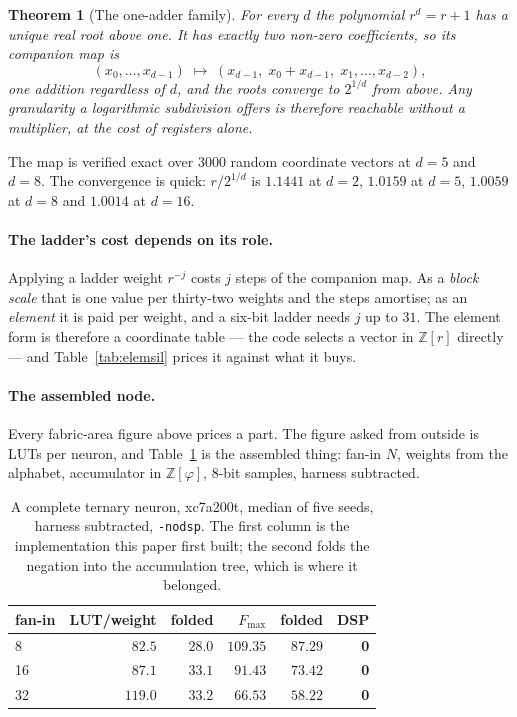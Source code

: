 \documentclass[11pt]{article}
\newtheorem{theorem}{Theorem}
\theoremstyle{definition}
\begin{document}
\begin{theorem}[The one-adder family]\label{thm:oneadder}
For every $d$ the polynomial $r^{d}=r+1$ has a unique real root above one. It
has exactly two non-zero coefficients, so its companion map is
\[
  (x_0,\dots,x_{d-1}) \;\mapsto\; (x_{d-1},\; x_0+x_{d-1},\; x_1,\dots,x_{d-2}),
\]
\emph{one addition} regardless of $d$, and the roots converge to $2^{1/d}$ from
above. Any granularity a logarithmic subdivision offers is therefore reachable
without a multiplier, at the cost of registers alone.
\end{theorem}

The map is verified exact over $3000$ random coordinate vectors at $d=5$ and
$d=8$. The convergence is quick: $r/2^{1/d}$ is $1.1441$ at $d=2$, $1.0159$ at
$d=5$, $1.0059$ at $d=8$ and $1.0014$ at $d=16$.

\paragraph{The ladder's cost depends on its role.} Applying a ladder weight
$r^{-j}$ costs $j$ steps of the companion map. As a \emph{block scale} that is
one value per thirty-two weights and the steps amortise; as an \emph{element} it
is paid per weight, and a six-bit ladder needs $j$ up to $31$. The element form
is therefore a coordinate table --- the code selects a vector in
$\mathbb{Z}[r]$ directly --- and Table~\ref{tab:elemsil} prices it against what
it buys.

\paragraph{The assembled node.} Every fabric-area figure above prices a part. The
figure asked from outside is LUTs per neuron, and Table~\ref{tab:node} is the
assembled thing: fan-in $N$, weights from the alphabet, accumulator in
$\mathbb{Z}[\varphi]$, 8-bit samples, harness subtracted.

\begin{table}[t]\centering
\caption{A complete ternary neuron, xc7a200t, median of five seeds, harness
subtracted, \texttt{-nodsp}. The first column is the implementation this paper
first built; the second folds the negation into the accumulation tree, which is
where it belonged.}
\label{tab:node}
\begin{tabular}{lrrrrr}
\toprule
fan-in & LUT/weight & folded & $F_{\max}$ & folded & DSP \\
\midrule
8  & $82.5$ & $\mathbf{28.0}$ & $109.35$ & $87.29$ & \textbf{0} \\
16 & $87.1$ & $\mathbf{33.1}$ & $91.43$ & $73.42$ & \textbf{0} \\
32 & $119.0$ & $\mathbf{33.2}$ & $66.53$ & $58.22$ & \textbf{0} \\
\bottomrule
\end{tabular}
\end{table}
\end{document}
